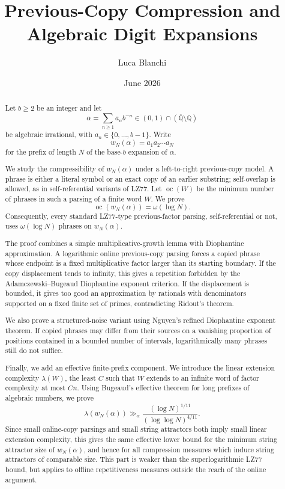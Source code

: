 \documentclass[11pt]{amsart}
\theoremstyle{definition}
\DeclareMathOperator{\oc}{oc}
\begin{document}
\title{Previous-Copy Compression and Algebraic Digit Expansions}

\author{Luca Blanchi}

\date{June 2026}

\begin{abstract}
Let \(b\geq 2\) be an integer and let
\[
\alpha=\sum_{n\geq 1}a_n b^{-n}
\in (0,1)\cap(\overline{\mathbb Q}\setminus\mathbb Q)
\]
be algebraic irrational, with \(a_n\in\{0,\ldots,b-1\}\). Write
\[
w_N(\alpha)=a_1a_2\cdots a_N
\]
for the prefix of length \(N\) of the base-\(b\) expansion of \(\alpha\).

We study the compressibility of \(w_N(\alpha)\) under a left-to-right previous-copy model. A phrase is either a literal symbol or an exact copy of an earlier substring; self-overlap is allowed, as in self-referential variants of LZ77. Let \(\oc(W)\) be the minimum number of phrases in such a parsing of a finite word \(W\). We prove
\[
\oc(w_N(\alpha))=\omega(\log N).
\]
Consequently, every standard LZ77-type previous-factor parsing, self-referential or not, uses \(\omega(\log N)\) phrases on \(w_N(\alpha)\).

The proof combines a simple multiplicative-growth lemma with Diophantine approximation. A logarithmic online previous-copy parsing forces a copied phrase whose endpoint is a fixed multiplicative factor larger than its starting boundary. If the copy displacement tends to infinity, this gives a repetition forbidden by the Adamczewski--Bugeaud Diophantine exponent criterion. If the displacement is bounded, it gives too good an approximation by rationals with denominators supported on a fixed finite set of primes, contradicting Ridout's theorem.

We also prove a structured-noise variant using Nguyen's refined Diophantine exponent theorem. If copied phrases may differ from their sources on a vanishing proportion of positions contained in a bounded number of intervals, logarithmically many phrases still do not suffice.

Finally, we add an effective finite-prefix component. We introduce the linear extension complexity \(\lambda(W)\), the least \(C\) such that \(W\) extends to an infinite word of factor complexity at most \(Cn\). Using Bugeaud's effective theorem for long prefixes of algebraic numbers, we prove
\[
\lambda(w_N(\alpha))
\gg_{\alpha}
\frac{(\log N)^{1/11}}{(\log\log N)^{4/11}}.
\]
Since small online-copy parsings and small string attractors both imply small linear extension complexity, this gives the same effective lower bound for the minimum string attractor size of \(w_N(\alpha)\), and hence for all compression measures which induce string attractors of comparable size. This part is weaker than the superlogarithmic LZ77 bound, but applies to offline repetitiveness measures outside the reach of the online argument.
\end{abstract}
\end{document}
